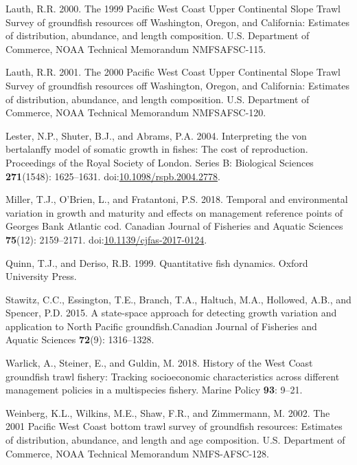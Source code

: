 \documentclass[
]{article}
\newlength{\cslhangindent}
\newlength{\cslentryspacingunit} %
\newenvironment{CSLReferences}[2] %
 {%
  \setlength{\parindent}{0pt}
  \ifodd #1
  \let\oldpar\par
  \def\par{\hangindent=\cslhangindent\oldpar}
  \fi
  \setlength{\parskip}{#2\cslentryspacingunit}
 }%
 {}
\newcommand{\cjfas}{Canadian Journal of Fisheries and Aquatic Sciences\xspace}
\begin{document}
\begin{CSLReferences}{1}{0}
\leavevmode{}%
Lauth, R.R. 2000. {The 1999 Pacific West Coast Upper Continental Slope
Trawl Survey of groundfish resources off Washington, Oregon, and
California: Estimates of distribution, abundance, and length
composition}. {U.S. Department of Commerce, NOAA Technical Memorandum
NMFSAFSC-115}.

\leavevmode{}%
Lauth, R.R. 2001. {The 2000 Pacific West Coast Upper Continental Slope
Trawl Survey of groundfish resources off Washington, Oregon, and
California: Estimates of distribution, abundance, and length
composition}. {U.S. Department of Commerce, NOAA Technical Memorandum
NMFSAFSC-120}.

\leavevmode{}%
Lester, N.P., Shuter, B.J., and Abrams, P.A. 2004. Interpreting the von
bertalanffy model of somatic growth in fishes: The cost of reproduction.
Proceedings of the Royal Society of London. Series B: Biological
Sciences \textbf{271}(1548): 1625--1631.
doi:\href{https://doi.org/10.1098/rspb.2004.2778}{10.1098/rspb.2004.2778}.

\leavevmode{}%
Miller, T.J., O'Brien, L., and Fratantoni, P.S. 2018. Temporal and
environmental variation in growth and maturity and effects on management
reference points of {G}eorges {B}ank {A}tlantic cod. Canadian Journal of
Fisheries and Aquatic Sciences \textbf{75}(12): 2159--2171.
doi:\href{https://doi.org/10.1139/cjfas-2017-0124}{10.1139/cjfas-2017-0124}.

\leavevmode{}%
Quinn, T.J., and Deriso, R.B. 1999. Quantitative fish dynamics. Oxford
University Press.

\leavevmode{}%
Stawitz, C.C., Essington, T.E., Branch, T.A., Haltuch, M.A., Hollowed,
A.B., and Spencer, P.D. 2015. A state-space approach for detecting
growth variation and application to {N}orth {P}acific groundfish.\cjfas
\textbf{72}(9): 1316--1328.

\leavevmode{}%
Warlick, A., Steiner, E., and Guldin, M. 2018. {History of the West
Coast groundfish trawl fishery: Tracking socioeconomic characteristics
across different management policies in a multispecies fishery}. Marine
Policy \textbf{93}: 9--21.

\leavevmode{}%
Weinberg, K.L., Wilkins, M.E., Shaw, F.R., and Zimmermann, M. 2002. The
2001 {P}acific {W}est {C}oast bottom trawl survey of groundfish
resources: Estimates of distribution, abundance, and length and age
composition. {U}.{S}. {D}epartment of {C}ommerce, {NOAA} {T}echnical
{M}emorandum {NMFS-AFSC}-128.

\end{CSLReferences}
\end{document}
